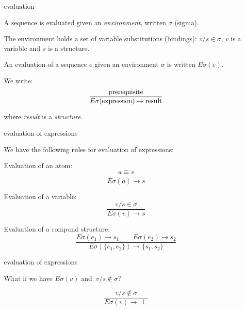\begin{frame}{evaluation}

A sequence is evaluated given an {\em environment}, written $\sigma$ (sigma).

\pause\vspace{20pt}
The environment holds a set of variable substitutions (bindings):
$v/s \in \sigma$, $v$ is a variable and $s$ is a structure.

\pause\vspace{20pt} 
An evaluation of a sequence $e$ given an environment
$\sigma$ is written $E\sigma(e)$. 

\pause\vspace{20pt}
We write:
\vspace{20pt}
$$\frac{{\rm prerequisite}}{E\sigma({\rm expression}) \rightarrow {\rm result}}$$

\vspace{20pt}
where {\em result} is a {\em structure}.

\end{frame}


\begin{frame}{evaluation of expressions}

We have the following rules for evaluation of expressions:

\vspace{10pt}\pause Evaluation of an atom: $$\frac{a \equiv s}{E\sigma(a) \rightarrow s}$$

\vspace{10pt}\pause Evaluation of a variable: $$\frac{v/s \in \sigma}{E\sigma(v) \rightarrow s}$$

\vspace{10pt}\pause Evaluation of a compund structure: $$\frac{ E\sigma(e_1) \rightarrow s_1 \qquad   E\sigma(e_2) \rightarrow s_2}{E\sigma(\lbrace e_1 , e_2\rbrace) \rightarrow \{s_1, s_2\}}$$
 
\end{frame}

\begin{frame}{evaluation of expressions}

  \vspace{20pt} What if we have $E\sigma(v)$ and $\ v/s \not\in \sigma$? 

  \pause $$\frac{ v/s \not\in \sigma}{E\sigma(v) \rightarrow  \perp}$$  

\end{frame}

